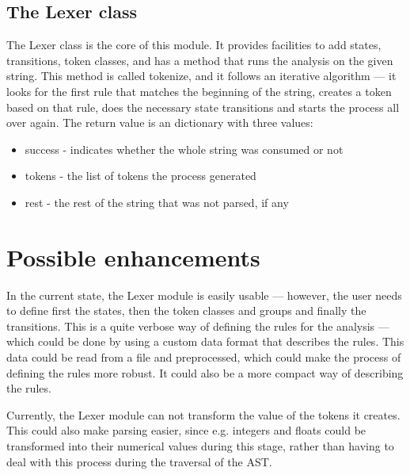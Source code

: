 \subsection{The Lexer class}
The Lexer class is the core of this module. It provides facilities to add states, transitions, token classes, and has a method that runs the analysis on the given string. This method is called tokenize, and it follows an iterative algorithm --- it looks for the first rule that matches the beginning of the string, creates a token based on that rule, does the necessary state transitions and starts the process all over again. The return value is an dictionary with three values:
\begin{itemize}
\item success - indicates whether the whole string was consumed or not
\item tokens - the list of tokens the process generated
\item rest - the rest of the string that was not parsed, if any
\end{itemize}
\section{Possible enhancements}
In the current state, the Lexer module is easily usable --- however, the user needs to define first the states, then the token classes and groups and finally the transitions. This is a quite verbose way of defining the rules for the analysis --- which could be done by using a custom data format that describes the rules. This data could be read from a file and preprocessed, which could make the process of defining the rules more robust. It could also be a more compact way of describing the rules.

Currently, the Lexer module can not transform the value of the tokens it creates. This could also make parsing easier, since e.g. integers and floats could be transformed into their numerical values during this stage, rather than having to deal with this process during the traversal of the AST.